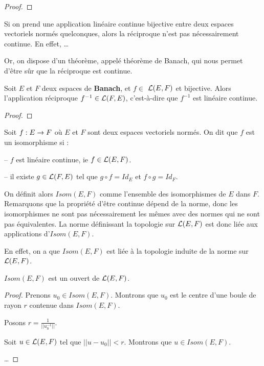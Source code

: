 \begin{proof}
	
\end{proof}


Si on prend une application linéaire continue bijective entre deux espaces
vectoriels normés quelconques, alors la réciproque n'est pas nécessairement
continue. En effet, \ldots %

Or, on dispose d'un théorème, appelé théorème de Banach, qui nous permet d'être
sûr que la réciproque est continue.

\begin{theorem} [Banach]
	\label{theorem_banach_isomorphism}
	Soit $E$ et $F$ deux espaces de \textbf{Banach}, et $f \in$
	$\mathcal{L}(E, F)$ et bijective.
	Alors l'application réciproque $f^{-1} \in \mathcal{L}(F, E)$,
	c'est-à-dire que $f^{-1}$ est linéaire continue.
\end{theorem}

\begin{proof}
	
\end{proof}

\begin{definition}
\label{definition_isomorphisme}
	Soit $f : E \rightarrow F$ où $E$ et $F$ sont deux espaces vectoriels
	normés.
	On dit que $f$ est un isomorphisme si :
	
	-- $f$ est linéaire continue, ie $f \in \mathcal{L}(E, F)$.

	-- il existe $g \in \mathcal{L}(F, E)$ tel que $g \circ f = Id_{E}$ et
	$f \circ g = Id_{F}$.
\end{definition}

On définit alors $Isom(E, F)$ comme l'ensemble des isomorphismes de $E$ dans
$F$.
Remarquons que la propriété d'être continue dépend de la norme, donc les
isomorphismes ne sont pas nécessairement les mêmes avec des normes qui ne sont
pas équivalentes. La norme définissant la topologie sur $\mathcal{L}(E, F)$
est donc liée aux applications d'$Isom(E, F)$.

En effet, on a que $Isom(E, F)$ est liée à la topologie induite de la norme sur
$\mathcal{L}(E, F)$.

\begin{proposition}
	$Isom(E, F)$ est un ouvert de $\mathcal{L}(E, F)$.
\end{proposition}

\begin{proof}
	Prenons $u_{0} \in Isom(E, F)$. Montrons que $u_{0}$ est le centre d'une
	boule de rayon $r$ contenue dans $Isom(E, F)$.

	Posons $r = \frac{1}{||u_{0}^{-1}||}$.

	Soit $u \in \mathcal{L}(E, F)$ tel que $||u - u_{0}|| < r$. Montrons
	que $u \in Isom(E, F)$.

	\ldots
\end{proof}

